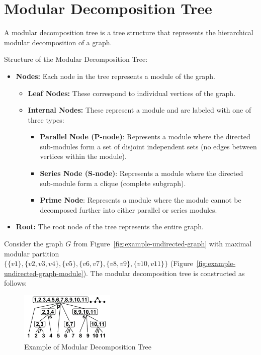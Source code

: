 \section{Modular Decomposition Tree}\label{sec:modular-decomposition-tree}

A modular decomposition tree is a tree structure that represents the hierarchical modular decomposition of a graph.

Structure of the Modular Decomposition Tree:
\begin{itemize}
    \item \textbf{Nodes:} Each node in the tree represents a module of the graph.
            \begin{itemize}
                \item \textbf{Leaf Nodes:} These correspond to individual vertices of the graph.
                \item \textbf{Internal Nodes:} These represent a module and are labeled with one of three types:
                        \begin{itemize}
                            \item \textbf{Parallel Node (P-node)}: Represents a module where the directed sub-modules form a set of disjoint independent sets (no edges between vertices within the module).
                            \item \textbf{Series Node (S-node)}: Represents a module where the directed sub-module form a clique (complete subgraph).
                            \item \textbf{Prime Node}: Represents a module where the module cannot be decomposed further into either parallel or series modules.
                        \end{itemize}
            \end{itemize}
    \item \textbf{Root:} The root node of the tree represents the entire graph.
\end{itemize}


\begin{Example}
    Consider the graph $G$ from Figure~\ref{fig:example-undirected-graph} with maximal modular partition \\ $\{\{v1\}, \{v2, v3, v4\}, \{v5\}, \{v6, v7\}, \{v8, v9\}, \{v10, v11\}\}$ (Figure~\ref{fig:example-undirected-graph-module}).
    The modular decomposition tree is constructed as follows:

    \begin{figure}[!h]
        \centering
        \includegraphics[width=0.40\textwidth]{images/graphs/undirected_graph_wikipedia_modular_decomposition}
        \caption{Example of Modular Decomposition Tree}
        \label{fig:example-undirected-graph-modular-decomposition-tree}
    \end{figure}
\end{Example}


